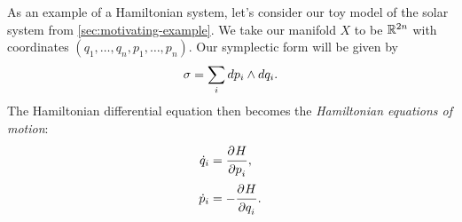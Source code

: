 \documentclass[twoside,letterpaper,10pt]{article}
\numberwithin{equation}{section}
\begin{document}
As an example of a Hamiltonian system, let's consider our toy model of the solar
system from \cref{sec:motivating-example}.
We take our manifold $X$ to be $\mathbb{R}^{2n}$ with coordinates $(q_1, \ldots, q_n,
p_1, \ldots, p_n)$.
Our symplectic form will be given by
\begin{equation*}
  \sigma = \sum_{i} \mathop{}\!d p_i \wedge \mathop{}\!d q_i.
\end{equation*}
The Hamiltonian differential equation then becomes the \emph{Hamiltonian
  equations of motion}:
\begin{equation}
  \label{eq:hamiltonian-motion-eq}
  \begin{aligned}
    \dot{q}_i &= \frac{\strut\partial^{}H}{\strut\partial p_i^{}},\\
    \dot{p}_i &= - \frac{\strut\partial^{}H}{\strut\partial q_i^{}}.
  \end{aligned}
\end{equation}
\end{document}
